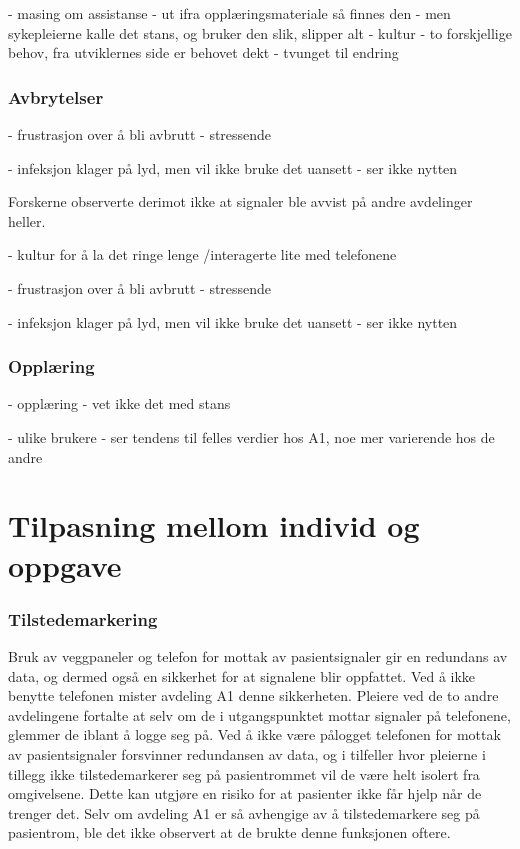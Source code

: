 - masing om assistanse
- ut ifra opplæringsmateriale så finnes den
- men sykepleierne kalle det stans, og bruker den slik, slipper alt
- kultur
- to forskjellige behov, fra utviklernes side er behovet dekt
- tvunget til endring

  
\subsubsection{Avbrytelser}
- frustrasjon over å bli avbrutt
	- stressende

- infeksjon klager på lyd, men vil ikke bruke det uansett
	- ser ikke nytten


Forskerne observerte derimot ikke at signaler ble avvist på andre avdelinger heller.

- kultur for å la det ringe lenge /interagerte lite med telefonene

- frustrasjon over å bli avbrutt
	- stressende

- infeksjon klager på lyd, men vil ikke bruke det uansett
	- ser ikke nytten
	

\subsubsection{Opplæring}	 	
- opplæring 
	- vet ikke det med stans

- ulike brukere
	- ser tendens til felles verdier hos A1, noe mer varierende hos de andre



\section{Tilpasning mellom individ og oppgave}

\subsubsection{Tilstedemarkering}
Bruk av veggpaneler og telefon for mottak av pasientsignaler gir en redundans av data, og dermed også en sikkerhet for at signalene blir oppfattet. Ved å ikke benytte telefonen mister avdeling A1 denne sikkerheten. Pleiere ved de to andre avdelingene fortalte at selv om de i utgangspunktet mottar signaler på telefonene, glemmer de iblant å logge seg på. Ved å ikke være pålogget telefonen for mottak av pasientsignaler forsvinner redundansen av data, og i tilfeller hvor pleierne i tillegg ikke tilstedemarkerer seg på pasientrommet vil de være helt isolert fra omgivelsene. Dette kan utgjøre en risiko for at pasienter ikke får hjelp når de trenger det. Selv om avdeling A1 er så avhengige av å tilstedemarkere seg på pasientrom, ble det ikke observert at de brukte denne funksjonen oftere. 



